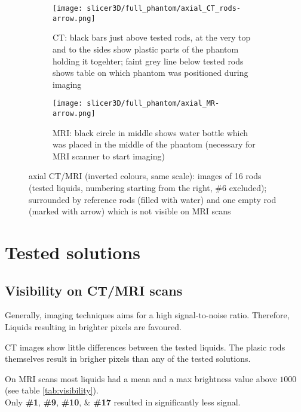 \begin{figure}[!tbp]
  \begin{subfigure}[b]{\textwidth}
    \texttt{[image: slicer3D/full\_phantom/axial\_CT\_rods-arrow.png]}
    \caption{CT: black bars just above tested rods, at the very top and to the sides show plastic parts of the phantom holding it togehter; faint grey line below tested rods shows table on which phantom was positioned during imaging}
    \label{fig:axial_CT_rods}
  \end{subfigure}
  \begin{subfigure}[b]{\textwidth}
    \texttt{[image: slicer3D/full\_phantom/axial\_MR-arrow.png]}
    \caption{MRI: black circle in middle shows water bottle which was placed in the middle of the phantom (necessary for MRI scanner to start imaging)}
    \label{fig:axial_MR}
  \end{subfigure}
  \caption{axial CT/MRI (inverted colours, same scale): images of 16 rods (tested liquids, numbering starting from the right, \#6 excluded); surrounded by reference rods (filled with water) and one empty rod (marked with arrow) which is not visible on MRI scans}
  \label{fig:axial}
\end{figure}


\section{Tested solutions}

\subsection{Visibility on CT/MRI scans}

Generally, imaging techniques aims for a high signal-to-noise ratio.
Therefore, Liquids resulting in brighter pixels are favoured.

CT images show little differences between the tested liquids. The plasic rods themselves result in brigher pixels than any of the tested solutions.

On MRI scans most liquids had a mean and a max brightness value above $1000$ (see table \ref{tab:visibility}).\\
Only \textbf{\#1}, \textbf{\#9}, \textbf{\#10}, \& \textbf{\#17} resulted in significantly less signal.



